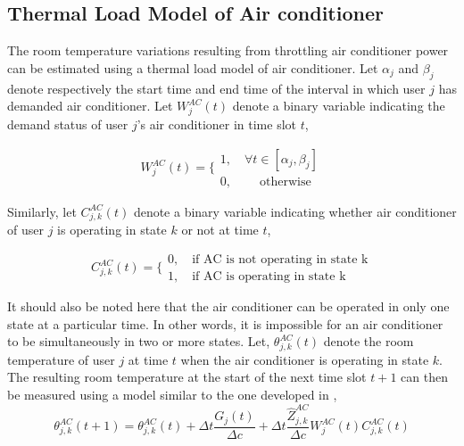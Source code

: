 \documentclass[10pt,twocolumn,twoside]{IEEEtran}
\begin{document}
\subsection{Thermal Load Model of Air conditioner}
The room temperature variations resulting from throttling air conditioner power can be estimated using a thermal load model of air conditioner. 
Let $\alpha_j$ and $\beta_j$ denote respectively the start time and end time of the interval in which user $j$ has demanded air conditioner. Let $W^{AC}_{j}(t)$ denote a binary variable indicating the demand status of user $j$'s air conditioner in time slot $t$,
\begin{center}
\begin{equation}
W^{AC}_{j}(t)=\Bigg\{\begin{array}{c}
                1,\quad \forall t\in [\alpha_j, \beta_j] \\
                0,\quad \quad \:  \text{otherwise}
                \end{array}
                \label{myc2}
\end{equation}
\end{center}
Similarly, let $C^{AC}_{j,k}(t)$ denote a binary variable indicating whether air conditioner of user $j$ is operating in state $k$ or not at time $t$,
\begin{center}
\begin{equation}
C^{AC}_{j,k}(t)=\Bigg\{\begin{array}{c}
                0,\quad \text{if AC is not operating in state k}\\
                1,\quad \text{if AC is operating in state k}
                \end{array}
                \label{myc3}
\end{equation}
\end{center}
It should also be noted here that the air conditioner can be operated in only one state at a particular time. In other words, it is impossible for an air conditioner to be simultaneously in two or more states. Let, $\theta^{AC}_{j,k}(t)$ denote the room temperature of user $j$ at time $t$ when the air conditioner is operating in state $k$. The resulting room temperature at the start of the next time slot $t+1$ can then be measured using a model similar to the one developed in \cite{g14},
\begin{equation} 
\theta^{AC}_{j,k}(t+1) = \theta^{AC}_{j,k}(t) + \Delta{t} \frac{G_j(t)}{\Delta{c}} + \Delta{t} \frac{\hat{Z}^{AC}_{j,k}}{\Delta{c}}{W}^{AC}_{j}(t)C^{AC}_{j,k}(t)
\label{Ti+1:hvac}
\end{equation}
\end{document}
